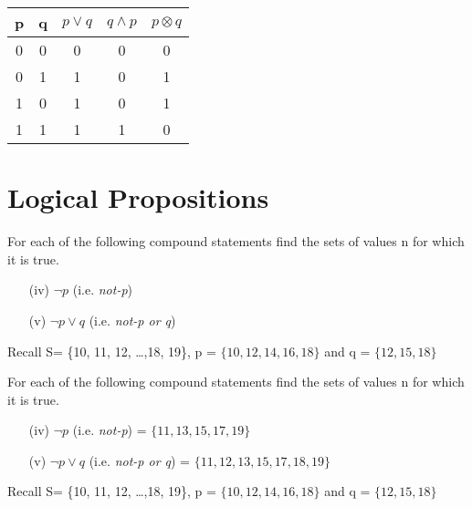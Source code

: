

\begin{center}
\begin{tabular}{|c|c|c|c|c|}
\hline
p & q & $p \vee q$ & $q \wedge p$ & $p \otimes q$ \\
\hline
0 & 0 & 0 & 0 & 0 \\
0 & 1 & 1 & 0 & 1\\
1 & 0 & 1 & 0 & 1 \\
1 & 1 & 1 & 1 & 0\\
\hline
\end{tabular}
\end{center}



\section{Logical Propositions}

For each of the following compound statements find the sets of values n for which it is true. %
\begin{itemize}
\item[(iv)] $\neg p $  (i.e. \textit{not-p}) %
\item[(v)] $\neg p \vee q$  (i.e. \textit{not-p or q}) %
\end{itemize}
Recall S= \{10, 11, 12, \ldots ,18, 19\}, p = $\{10,12,14,16,18\}$  and q = $\{12,15,18\}$

For each of the following compound statements find the sets of values n for which it is true. %
\begin{itemize}
\item[(iv)] $\neg p $  (i.e. \textit{not-p}) = $\{ 11, 13, 15, 17, 19\}$
\item[(v)] $\neg p \vee q$  (i.e. \textit{not-p or q}) =  $\{11, 12, 13, 15, 17, 18, 19\}$
\end{itemize}

Recall S= \{10, 11, 12, \ldots ,18, 19\}, p = $\{10,12,14,16,18\}$  and q = $\{12,15,18\}$



